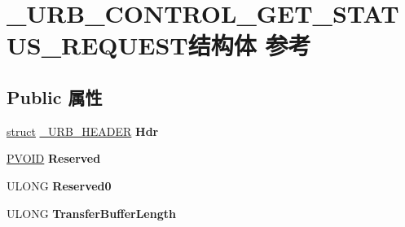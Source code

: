 \hypertarget{struct___u_r_b___c_o_n_t_r_o_l___g_e_t___s_t_a_t_u_s___r_e_q_u_e_s_t}{}\section{\+\_\+\+U\+R\+B\+\_\+\+C\+O\+N\+T\+R\+O\+L\+\_\+\+G\+E\+T\+\_\+\+S\+T\+A\+T\+U\+S\+\_\+\+R\+E\+Q\+U\+E\+S\+T结构体 参考}
\label{struct___u_r_b___c_o_n_t_r_o_l___g_e_t___s_t_a_t_u_s___r_e_q_u_e_s_t}
\subsection*{Public 属性}
\begin{DoxyCompactItemize}
\item 
\mbox{\label{struct___u_r_b___c_o_n_t_r_o_l___g_e_t___s_t_a_t_u_s___r_e_q_u_e_s_t_abca57eed37bea9c7c4b8ca6840a9341d}} 
\hyperlink{interfacestruct}{struct} \hyperlink{struct___u_r_b___h_e_a_d_e_r}{\+\_\+\+U\+R\+B\+\_\+\+H\+E\+A\+D\+ER} {\bfseries Hdr}
\item 
\mbox{\label{struct___u_r_b___c_o_n_t_r_o_l___g_e_t___s_t_a_t_u_s___r_e_q_u_e_s_t_a20c4be97b37e28b37f6b812cc8e10398}} 
\hyperlink{interfacevoid}{P\+V\+O\+ID} {\bfseries Reserved}
\item 
\mbox{\label{struct___u_r_b___c_o_n_t_r_o_l___g_e_t___s_t_a_t_u_s___r_e_q_u_e_s_t_a83a53086be0d6cf7abf868b867264736}} 
U\+L\+O\+NG {\bfseries Reserved0}
\item 
\mbox{\label{struct___u_r_b___c_o_n_t_r_o_l___g_e_t___s_t_a_t_u_s___r_e_q_u_e_s_t_a3e3fd997d8fee6ad18ea4383321981ba}} 
U\+L\+O\+NG {\bfseries Transfer\+Buffer\+Length}
\item 
\mbox{\label{struct___u_r_b___c_o_n_t_r_o_l___g_e_t___s_t_a_t_u_s___r_e_q_u_e_s_t_adb3876fcf076f5893434aa27501b95dd}} 

\end{DoxyCompactItemize}
